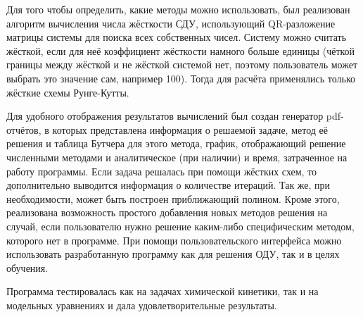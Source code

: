 Для того чтобы определить, какие методы можно использовать, был реализован алгоритм вычисления числа жёсткости СДУ, использующий QR-разложение матрицы системы для поиска всех собственных чисел. Систему можно считать жёсткой, если для неё коэффициент жёсткости намного больше единицы (чёткой границы между жёсткой и не жёсткой системой нет, поэтому пользователь может выбрать это значение сам, например 100). Тогда для расчёта применялись только жёсткие схемы Рунге-Кутты.

Для удобного отображения результатов вычислений был создан генератор pdf-отчётов, в которых представлена информация о решаемой задаче, метод её решения и таблица Бутчера для этого метода, график, отображающий решение численными методами и аналитическое (при наличии) и время, затраченное на работу программы. Если задача решалась при помощи жёстких схем, то дополнительно выводится информация о количестве итераций. Так же, при необходимости, может быть построен приближающий полином. Кроме этого, реализована возможность простого добавления новых методов решения на случай, если пользователю нужно решение каким-либо специфическим методом, которого нет в программе. При помощи пользовательского интерфейса можно использовать разработанную программу как для решения ОДУ, так и в целях обучения.

Программа тестировалась как на задачах химической кинетики, так и на модельных уравнениях и дала удовлетворительные результаты.
